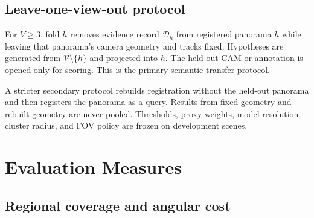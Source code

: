 \documentclass[a4paper,9pt]{extarticle}
\begin{document}
\subsection{Leave-one-view-out protocol}

For $V\ge3$, fold $h$ removes evidence record $\mathcal D_h$ from registered panorama $h$ while leaving that panorama's camera geometry and tracks fixed. Hypotheses are generated from
$\mathcal V\setminus\{h\}$ and projected into $h$. The held-out CAM or annotation is opened only for scoring. This is the primary semantic-transfer protocol.

A stricter secondary protocol rebuilds registration without the held-out panorama and then registers the panorama as a query. Results from fixed geometry and rebuilt geometry are never pooled. Thresholds, proxy weights, model resolution, cluster radius, and FOV policy are frozen on development scenes.

\section{Evaluation Measures}

\subsection{Regional coverage and angular cost}
\end{document}
